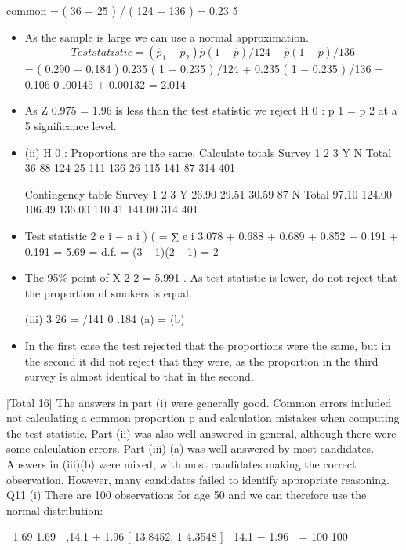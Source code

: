 \documentclass[a4paper,12pt]{article}
\begin{document}
common  = ( 36 + 25 ) / ( 124 + 136 ) = 0.23 5

\begin{itemize}
\item As the sample is large we can use a normal approximation.
\[Test statistic =
( \hat{p}_1 − \hat{p}_2 )
\hat{p} (1 − \hat{p} ) /124 + \hat{p} (1 − \hat{p} ) /136\]
= ( 0.290 − 0.184 )
0.235 ( 1 − 0.235 ) /124 + 0.235 ( 1 − 0.235 ) /136
= 0.106
0 .00145 + 0.00132
= 2.014

\item As Z 0.975 = 1.96 is less than the test statistic we reject H 0 : p 1 = p 2 at a 5%
significance level.

\item (ii)
H 0 : Proportions are the same.
Calculate totals
Survey 1 2 3
Y
N
Total 36
88
124 25
111
136 26
115
141
87
314
401

Contingency table
Survey 1 2 3
Y 26.90 29.51 30.59
87
N
Total
97.10
124.00
106.49
136.00
110.41
141.00
314
401

\item Test statistic
2
e i − a i )
(
=
∑
e i
3.078 + 0.688 + 0.689 + 0.852 + 0.191 + 0.191 =
5.69
=
d.f. = (3 – 1)(2 – 1) = 2


\item The 95\%  point of X 2 2 = 5.991 . As test statistic is lower, do not reject that the
proportion of smokers is equal.

(iii)
 3 26
=
/141 0 .184
(a) =
(b)

\item In the first case the test rejected that the proportions were the same, but
in the second it did not reject that they were, as the proportion in the
third survey is almost identical to that in the second.
\end{itemize}
[Total 16]
The answers in part (i) were generally good. Common errors included not calculating a common proportion p and calculation mistakes when
computing the test statistic. Part (ii) was also well answered in general, although there were some calculation errors. Part (iii) (a) was well
answered by most candidates. Answers in (iii)(b) were mixed, with most candidates making the correct observation. However, many candidates
failed to identify appropriate reasoning.
\newpage
Q11
(i)
There are 100 observations for age 50 and we can therefore use the normal distribution:


1.69
1.69 
,14.1 + 1.96
[ 13.8452, 1 4.3548 ]
 14.1 − 1.96
 =
100
100


\end{document}
